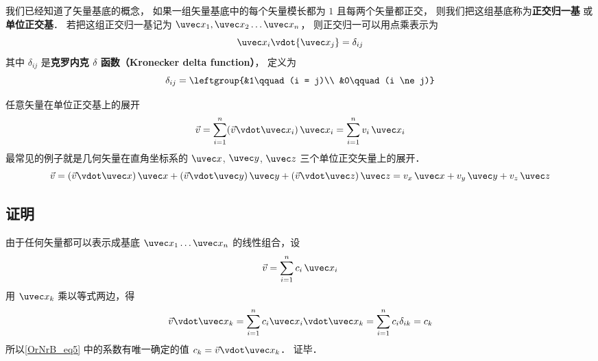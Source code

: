 

我们已经知道了矢量基底的概念， 如果一组矢量基底中的每个矢量模长都为 $1$ 且每两个矢量都正交， 则我们把这组基底称为\textbf{正交归一基} 或\textbf{单位正交基}． 若把这组正交归一基记为 $\uvec x_1,\uvec x_2\dots\uvec x_n$， 则正交归一可以用点乘表示为
\begin{equation}
{\uvec x_i}\vdot{\uvec x_j} = {\delta _{ij}}
\end{equation}
其中 $\delta_{ij}$ 是\textbf{克罗内克 $\delta$ 函数（Kronecker delta function）}， 定义为
\begin{equation}\label{OrNrB_eq2}
\delta_{ij} = \leftgroup{&1\qquad (i = j)\\ &0\qquad (i \ne j)}
\end{equation}

任意矢量在单位正交基上的展开
 \begin{equation}
\vec v = \sum_{i = 1}^n (\vec v\vdot\uvec x_i)\,\uvec x_i = \sum_{i = 1}^n v_i \,\uvec x_i
\end{equation}
最常见的例子就是几何矢量在直角坐标系的 $\uvec x$, $\uvec y$, $\uvec z$ 三个单位正交矢量上的展开．
 \begin{equation}
\vec v = (\vec v \vdot \uvec x)\,\uvec x + (\vec v \vdot \uvec y)\,\uvec y + (\vec v \vdot \uvec z)\,\uvec z = v_x \,\uvec x + v_y \,\uvec y + v_z \,\uvec z
\end{equation} 

\subsection{证明}
由于任何矢量都可以表示成基底 ${\uvec x_1}\dots{\uvec x_n}$ 的线性组合，设
\begin{equation}\label{OrNrB_eq5}
\vec v = \sum_{i = 1}^n {{c_i}{{\,\uvec x}_i}} 
\end{equation} 
用 ${\uvec x_k}$ 乘以等式两边，得
\begin{equation}
\vec v{\vdot\uvec x_k} = \sum_{i = 1}^n  c_i \uvec x_i \vdot\uvec x_k = \sum_{i = 1}^n c_i \delta_{ik}  = c_k
\end{equation}
所以\autoref{OrNrB_eq5} 中的系数有唯一确定的值 $c_k = \vec v \vdot\uvec x_k$． 证毕．






